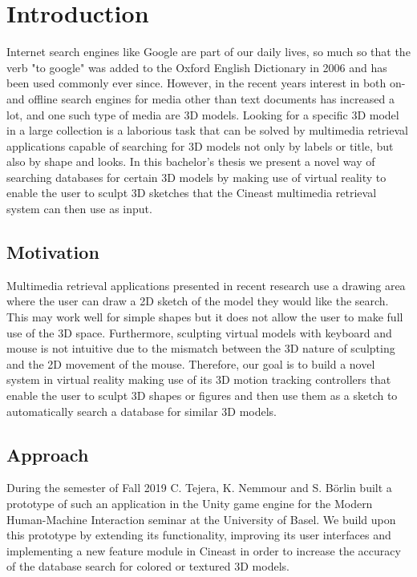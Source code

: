 \chapter{Introduction}

Internet search engines like Google are part of our daily lives, so much so that the verb "to google" was added to the Oxford English Dictionary in 2006 and has been used commonly ever since. However, in the recent years interest in 
both on- and offline search engines for media other than text documents has increased a lot, and one such type of media are 3D models. Looking for a specific 3D model in a large collection is a laborious task that can be solved by multimedia retrieval applications capable of searching for 3D models not only by labels or title, but also by shape and looks. In this bachelor's thesis we present a novel way of searching databases for certain 3D models by making use of virtual reality to enable the user to sculpt 3D sketches that the Cineast multimedia retrieval system can then use as input.

\section{Motivation}

Multimedia retrieval applications presented in recent research use a drawing area where the user can draw a 2D sketch of the model they would like the search. This may work well for simple shapes but it does not allow the user to make full use of the 3D space. Furthermore, sculpting virtual models with keyboard and mouse is not intuitive due to the mismatch between the 3D nature of sculpting and the 2D movement of the mouse. Therefore, our goal is to build a novel system in virtual reality making use of its 3D motion tracking controllers that enable the user to sculpt 3D shapes or figures and then use them as a sketch to automatically search a database for similar 3D models.

\section{Approach}
\label{sec:approach}

During the semester of Fall 2019 C. Tejera, K. Nemmour and S. Börlin built a prototype of such an application in the Unity game engine for the Modern Human-Machine Interaction seminar at the University of Basel.
We build upon this prototype by extending its functionality, improving its user interfaces and implementing a new feature module in Cineast in order to increase the accuracy of the database search for colored or textured 3D models.